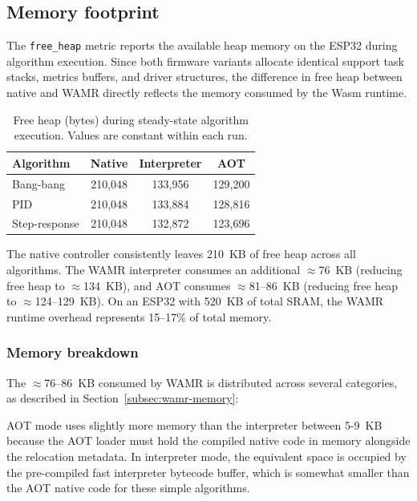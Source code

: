 \documentclass[12pt, a4paper]{report}
\begin{document}
\subsection{Memory footprint}
\label{sec:memory}

The \texttt{free\_heap} metric reports the available heap memory on the ESP32 during algorithm execution. Since both firmware variants allocate identical support task stacks, metrics buffers, and driver structures, the difference in free heap between native and WAMR directly reflects the memory consumed by the Wasm runtime.

\begin{table}[htbp]
\centering
\caption{Free heap (bytes) during steady-state algorithm execution. Values are constant within each run.}
\label{tab:free-heap}
\small
\begin{tabular}{@{}lccc@{}}
\toprule
\textbf{Algorithm} & \textbf{Native} & \textbf{Interpreter} & \textbf{AOT} \\
\midrule
Bang-bang      & 210,048 & 133,956 & 129,200 \\
PID            & 210,048 & 133,884 & 128,816 \\
Step-response  & 210,048 & 132,872 & 123,696 \\
\bottomrule
\end{tabular}
\end{table}

The native controller consistently leaves 210~KB of free heap across all algorithms. The WAMR interpreter consumes an additional $\approx$76~KB (reducing free heap to $\approx$134~KB), and AOT consumes $\approx$81--86~KB (reducing free heap to $\approx$124--129~KB). On an ESP32 with 520~KB of total SRAM, the WAMR runtime overhead represents 15--17\% of total memory.

\subsubsection{Memory breakdown}
\label{subsec:memory-breakdown}

The $\approx$76--86~KB consumed by WAMR is distributed across several categories, as described in Section~\ref{subsec:wamr-memory}:

AOT mode uses slightly more memory than the interpreter between 5-9~KB because the AOT loader must hold the compiled native code in memory alongside the relocation metadata. In interpreter mode, the equivalent space is occupied by the pre-compiled fast interpreter bytecode buffer, which is somewhat smaller than the AOT native code for these simple algorithms.
\end{document}
